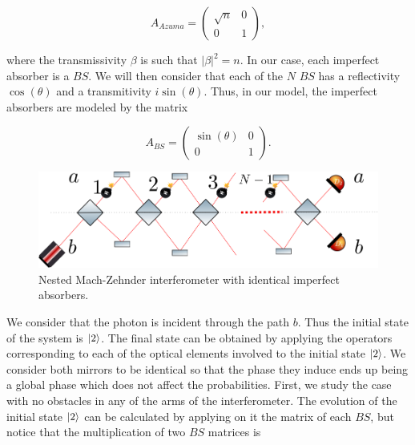 \documentclass[12pt]{book}
\begin{document}
 \begin{equation}
 A_{Azuma}=\begin{pmatrix} \sqrt{n} & 0\\0& 1\end{pmatrix},
\label{absorber}
 \end{equation}
 
 where the transmissivity $\beta$  is such that $|\beta|^{2}=n$. In our case, each imperfect absorber is a $BS$. We will then consider that each of the $N$ $BS$ has a reflectivity $\cos(\theta)$ and a transmitivity $i\sin(\theta)$. Thus, in our model, the imperfect absorbers are modeled by the matrix
 

\begin{equation}
 A_{BS}=\begin{pmatrix} \sin(\theta) & 0\\0& 1\end{pmatrix}.
\label{absorber1}
\end{equation}

\begin{figure}[t!]
\centering
\includegraphics[width=\linewidth]{images/nmach2.png}
\caption{Nested Mach-Zehnder interferometer  with identical imperfect absorbers.}
\label{Nmach}
\end{figure}


We consider that the photon is incident through the path $b$. Thus the initial state of the system is $\ket{2}$. The final state can be obtained by applying the operators corresponding to each of the optical elements involved to the initial state $\ket{2}$. We consider both mirrors to be identical so that the phase they induce ends up being a global phase which does not affect the probabilities. First, we study the case with no obstacles in any of the arms of the interferometer. The evolution of the initial state $\ket{2}$ can be calculated by applying on it the matrix of each $BS$, but notice that the multiplication of two $BS$ matrices is
\end{document}
